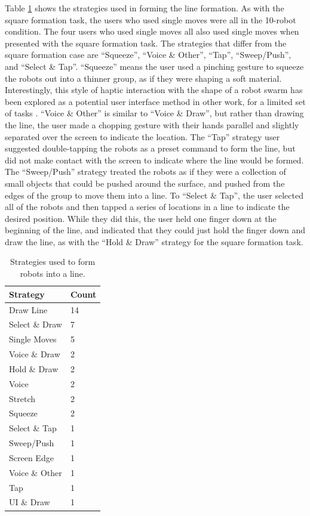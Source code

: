 Table \ref{tab:line_strategies} shows the strategies used in forming the line formation. 
As with the square formation task, the users who used single moves were all in the 10-robot condition. 
The four users who used single moves all also used single moves when presented with the square formation task. 
The strategies that differ from the square formation case are ``Squeeze'', ``Voice \& Other'', ``Tap'', ``Sweep/Push'', and ``Select \& Tap''. 
``Squeeze'' means the user used a pinching gesture to squeeze the robots out into a thinner group, as if they were shaping a soft material. 
Interestingly, this style of haptic interaction with the shape of a robot swarm has been explored as a potential user interface method in other work, for a limited set of tasks \citep{mcdonald2017haptic}.
``Voice \& Other'' is similar to ``Voice \& Draw'', but rather than drawing the line, the user made a chopping gesture with their hands parallel and slightly separated over the screen to indicate the location. 
The ``Tap'' strategy user suggested double-tapping the robots as a preset command to form the line, but did not make contact with the screen to indicate where the line would be formed. 
The ``Sweep/Push'' strategy treated the robots as if they were a collection of small objects that could be pushed around the surface, and pushed from the edges of the group to move them into a line. 
To ``Select \& Tap'', the user selected all of the robots and then tapped a series of locations in a line to indicate the desired position.
While they did this, the user held one finger down at the beginning of the line, and indicated that they could just hold the finger down and draw the line, as with the ``Hold \& Draw'' strategy for the square formation task. 

\begin{table}
	\begin{tabular}{l l}
		Strategy & Count\\
		\hline
		Draw Line & 14\\
		Select \& Draw & 7\\
		Single Moves & 5\\
		Voice \& Draw & 2\\
		Hold \& Draw & 2\\
		Voice & 2\\
		Stretch & 2\\
		Squeeze & 2\\
		Select \& Tap & 1 \\
		Sweep/Push & 1\\
		Screen Edge & 1\\
		Voice \& Other & 1\\
		Tap & 1 \\
		UI \& Draw & 1\\
	\end{tabular}
	\caption{Strategies used to form robots into a line.}
	\label{tab:line_strategies}
\end{table}

